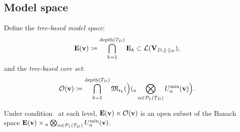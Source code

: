 \subsection*{Model space}

Define the \emph{tree-based model space}:
\begin{equation}
\label{eq:TBT_model}
    \mathbf{E}(\mathbf{v}) \coloneqq
    \bigcap_{k=1}^{\mathrm{depth}(T_D)} \mathbf{E}_{k}
    \subset \mathcal{L}(\mathbf{V}_{D,\|\cdot\|_D}),
\end{equation}
and the \emph{tree-based core set}:
\begin{equation*}
    \mathcal{O}(\mathbf{v}) \coloneqq
    \bigcap_{k=1}^{\mathrm{depth}(T_D)}
    \mathfrak{M}_{\mathfrak{r}_k}(\Bigl)({}_a\bigotimes_{\alpha \in \mathcal{P}_{k}(T_D)}
    U^{\min}_{\alpha}(\mathbf{v})\Bigr).
\end{equation*}

\begin{lemma}
\label{lem:TBT_chart_open}
Under condition \condINJ\ at each level, $\mathbf{E}(\mathbf{v}) \times
\mathcal{O}(\mathbf{v})$ is an open subset of the Banach space
$\mathbf{E}(\mathbf{v}) \times {}_a\bigotimes_{\alpha \in \mathcal{P}_{1}(T_D)}
U^{\min}_{\alpha}(\mathbf{v})$.
\end{lemma}

